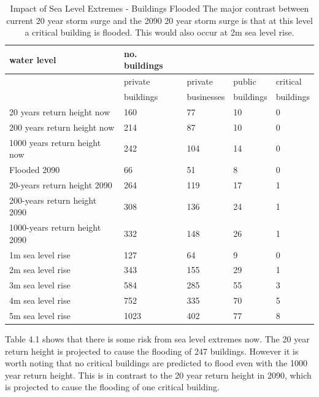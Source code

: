 \begin{table}[h]
    \centering
    \begin{tabular}{|l|l|l|l|l|}
    \hline
        water level & no. buildings  & ~ & ~ & ~ \\ \hline
        ~ & private & private & public  & critical  \\ \newline
        ~ & buildings & businesses & buildings & buildings \\ \hline        
        20 years return height now & 160 & 77 & 10 & 0 \\ \hline
        200 years return height now & 214 & 87 & 10 & 0 \\ \hline
        1000 years return height now & 242 & 104 & 14 & 0 \\ \hline
        Flooded 2090 & 66 & 51 & 8 & 0 \\ \hline
        20-years return height 2090 & 264 & 119 & 17 & 1 \\ \hline
        200-years return height  2090 & 308 & 136 & 24 & 1 \\ \hline
        1000-years return height  2090 & 332 & 148 & 26 & 1 \\ \hline
        1m sea level rise & 127 & 64 & 9 & 0 \\ \hline
        2m sea level rise & 343 & 155 & 29 & 1 \\ \hline
        3m sea level rise & 584 & 285 & 55 & 3 \\ \hline
        4m sea level rise & 752 & 335 & 70 & 5 \\ \hline
        5m sea level rise & 1023 & 402 & 77 & 8 \\ \hline
    \end{tabular}
    \caption{Impact of Sea Level Extremes - Buildings Flooded \cite{kartverket_se_2021} The major contrast between current 20 year storm surge and the 2090 20 year storm surge is that at this level a critical building is flooded. This would also occur at 2m sea level rise.}
    \label{building-impact-sle}
\end{table}


Table 4.1 shows that there is some risk from sea level extremes now. The 20 year return height is projected to cause the flooding of 247 buildings. However it is worth noting that no critical buildings are predicted to flood even with the 1000 year return height. This is in contrast to the 20 year return height in 2090, which is projected to cause the flooding of one critical building.

